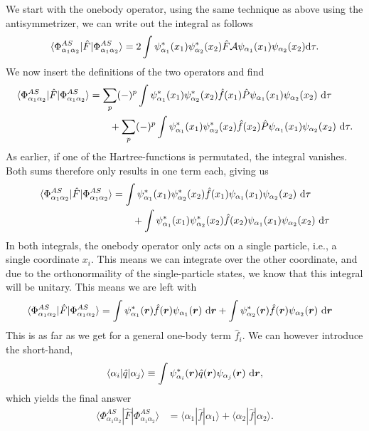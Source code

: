 \documentclass[a4paper, 11pt, notitlepage, english]{article}
\newcommand{\op}[1]{\hat{#1}}
\newcommand{\braopket}[3]{\langle #1 | {#2} | #3 \rangle}
\renewcommand{\d}{{\rm d}}
\newcommand{\bt}[1]{\boldsymbol{#1}}
\begin{document}
We start with the onebody operator, using the same technique as above using the antisymmetrizer, we can write out the integral as follows
$$\braopket{\Phi^{AS}_{\alpha_1\alpha_2}}{\op{F}}{\Phi^{AS}_{\alpha_1\alpha_2}} = 2\int \psi^*_{\alpha_1}(x_1)\psi^*_{\alpha_2}(x_2) \op{F} \mathcal{A} \psi_{\alpha_1}(x_1) \psi_{\alpha_2}(x_2) \d \tau.$$
We now insert the definitions of the two operators and find
\begin{align*}
\braopket{\Phi^{AS}_{\alpha_1\alpha_2}}{\op{F}}{\Phi^{AS}_{\alpha_1\alpha_2}} &= \sum_p (-)^p \int \psi^*_{\alpha_1}(x_1)\psi^*_{\alpha_2}(x_2) \op{f}(x_1) \op{P} \psi_{\alpha_1}(x_1)\psi_{\alpha_2}(x_2) \ \d \tau \\
&\qquad + \sum_p (-)^p \int \psi^*_{\alpha_1}(x_1)\psi^*_{\alpha_2}(x_2) \op{f}(x_2) \op{P} \psi_{\alpha_1}(x_1)\psi_{\alpha_2}(x_2) \ \d \tau.
\end{align*}
As earlier, if one of the Hartree-functions is permutated, the integral vanishes. Both sums therefore only results in one term each, giving us
\begin{align*}
\braopket{\Phi^{AS}_{\alpha_1\alpha_2}}{\op{F}}{\Phi^{AS}_{\alpha_1\alpha_2}} &=  \int \psi^*_{\alpha_1}(x_1)\psi^*_{\alpha_2}(x_2) \op{f}(x_1)  \psi_{\alpha_1}(x_1)\psi_{\alpha_2}(x_2) \ \d \tau \\
&\qquad +  \int \psi^*_{\alpha_1}(x_1)\psi^*_{\alpha_2}(x_2) \op{f}(x_2)  \psi_{\alpha_1}(x_1)\psi_{\alpha_2}(x_2) \ \d \tau
\end{align*}
In both integrals, the onebody operator only acts on a single particle, i.e., a single coordinate $x_i$. This means we can integrate over the other coordinate, and due to the orthonormaility of the single-particle states, we know that this integral will be unitary. This means we are left with
\begin{align*}
\braopket{\Phi^{AS}_{\alpha_1\alpha_2}}{\op{F}}{\Phi^{AS}_{\alpha_1\alpha_2}} &=  \int \psi^*_{\alpha_1}(\bt{r}) \op{f}(\bt{r})  \psi_{\alpha_1}(\bt{r}) \ \d \bt{r} +  \int \psi^*_{\alpha_2}(\bt{r}) \op{f}(\bt{r})  \psi_{\alpha_2}(\bt{r}) \ \d \bt{r}
\end{align*}
This is as far as we get for a general one-body term $\op{f}_i$. We can however introduce the short-hand,
$$\braopket{\alpha_i}{\op{q}}{\alpha_j} \equiv  \int \psi^*_{\alpha_i}(\bt{r}) \op{q}(\bt{r})  \psi_{\alpha_j}(\bt{r}) \ \d \bt{r},$$
which yields the final answer
\begin{align*}
\braopket{\Phi^{AS}_{\alpha_1\alpha_2}}{\op{F}}{\Phi^{AS}_{\alpha_1\alpha_2}} &=  \braopket{\alpha_1}{\op{f}}{\alpha_1} + \braopket{\alpha_2}{\op{f}}{\alpha_2}.
\end{align*}
\end{document}

